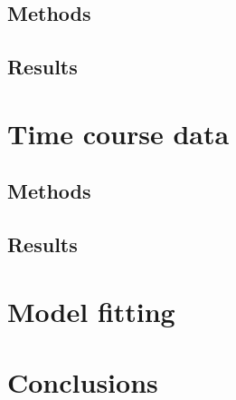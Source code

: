 \subsection{Methods}
\subsection{Results}
\section{Time course data}
\subsection{Methods}
\subsection{Results}
\section{Model fitting}
\section{Conclusions}
